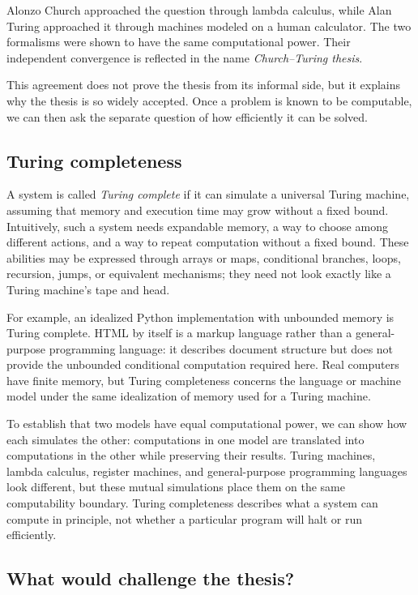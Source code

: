 \documentclass[11pt]{article}
\begin{document}
Alonzo Church approached the question through lambda calculus, while Alan
Turing approached it through machines modeled on a human calculator. The two
formalisms were shown to have the same computational power. Their independent
convergence is reflected in the name \emph{Church--Turing thesis}.

This agreement does not prove the thesis from its informal side, but it explains
why the thesis is so widely accepted. Once a problem is known to be computable,
we can then ask the separate question of how efficiently it can be solved.

\subsection{Turing completeness}

A system is called \emph{Turing complete} if it can simulate a universal Turing
machine, assuming that memory and execution time may grow without a fixed bound.
Intuitively, such a system needs expandable memory, a way to choose among
different actions, and a way to repeat computation without a fixed bound. These
abilities may be expressed through arrays or maps, conditional branches,
loops, recursion, jumps, or equivalent mechanisms; they need not look exactly
like a Turing machine's tape and head.

For example, an idealized Python implementation with unbounded memory is Turing
complete. HTML by itself is a markup language rather than a general-purpose
programming language: it describes document structure but does not provide the
unbounded conditional computation required here. Real computers have finite
memory, but Turing completeness concerns the language or machine model under
the same idealization of memory used for a Turing machine.

To establish that two models have equal computational power, we can show how
each simulates the other: computations in one model are translated into
computations in the other while preserving their results. Turing machines,
lambda calculus, register machines, and general-purpose programming languages
look different, but these mutual simulations place them on the same
computability boundary. Turing completeness describes what a system can compute
in principle, not whether a particular program will halt or run efficiently.

\subsection{What would challenge the thesis?}
\end{document}
